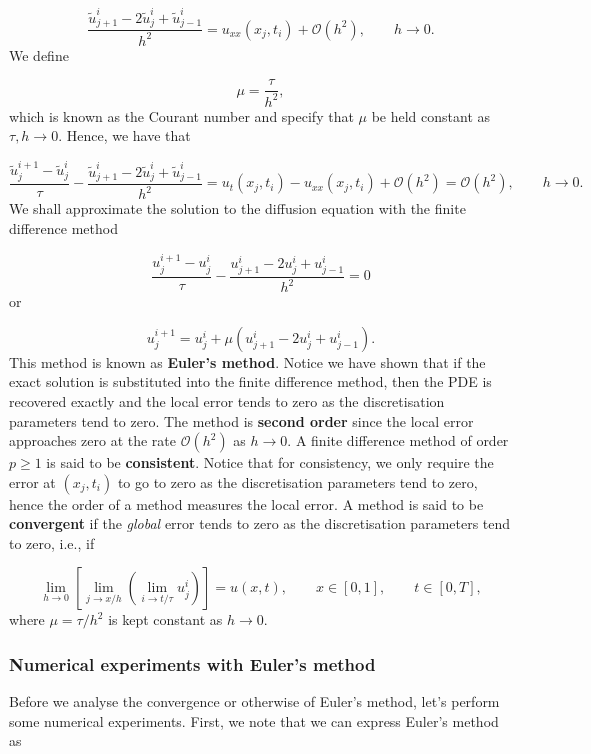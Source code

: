 \documentclass[12pt,landscape]{article}
\begin{document}
{\[
\frac{\tilde{u}^{i}_{j+1} - 2\tilde{u}^i_j + \tilde{u}^i_{j-1}}{h^2} = u_{xx}(x_j,t_i) + \mathcal{O}(h^2), \qquad h \to 0.
\]
We define

\[
\mu = \frac{\tau}{h^2},
\]
which is known as the Courant number and specify that $\mu$ be held constant as $\tau, h \to 0$. Hence, we have that

\[
\frac{\tilde{u}^{i+1}_j - \tilde{u}^i_j}{\tau} - \frac{\tilde{u}^{i}_{j+1} - 2\tilde{u}^i_j + \tilde{u}^i_{j-1}}{h^2} = u_t(x_j,t_i) - u_{xx}(x_j,t_i) + \mathcal{O}(h^2) =  \mathcal{O}(h^2), \qquad h \to 0.
\]
We shall approximate the solution to the diffusion equation with the finite difference method

\[
\frac{u^{i+1}_j - u^i_j}{\tau} - \frac{u^{i}_{j+1} - 2u^i_j + u^i_{j-1}}{h^2} = 0
\]
or

\[
u^{i+1}_j = u^i_j + \mu \left( u^{i}_{j+1} - 2u^i_j + u^i_{j-1}  \right).
\]
This method is known as \textbf{Euler's method}. Notice we have shown that if the exact solution is substituted into the finite difference method, then the PDE is recovered exactly and the local error tends to zero as the discretisation parameters tend to zero.  The method is \textbf{second order} since the local error approaches zero at the rate $\mathcal{O}(h^2)$ as $h \to 0$. A finite difference method of order $p \geq 1$ is said to be \textbf{consistent}.  Notice that for consistency, we only require the error at $(x_j,t_i)$  to go to zero as the discretisation parameters tend to zero, hence the order of a method measures the local error.  A method is said to be \textbf{convergent} if the \emph{global} error tends to zero as the discretisation parameters tend to zero, i.e., if

\[
\lim_{h \to 0}\left[\lim_{j \to x/h}\left( \lim_{i \to t/\tau} u^i_j \right)   \right] = u(x,t), \qquad x \in [0, 1], \qquad t \in [0, T],
\]
where $\mu = \tau/h^2$ is kept constant as $h \to 0$.

\subsubsection{Numerical experiments with Euler's method}
Before we analyse the convergence or otherwise of Euler's method, let's perform some numerical experiments.  First, we note that we can express Euler's method as

}
\end{document}

